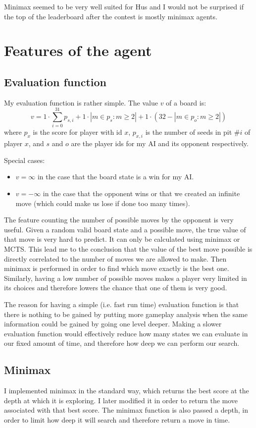 \documentclass{article}
\begin{document}
Minimax seemed to be very well suited for Hus and I would not be surprised if the top of the leaderboard after the contest is mostly minimax agents.

\section{Features of the agent}
\subsection{Evaluation function}
My evaluation function is rather simple. The value $v$ of a board is:
$$v = 1 \cdot \sum_{i=0}^{31} p_{s,i} + 1 \cdot | m \in p_s : m \geq 2 | + 1 \cdot (32-| m \in p_o : m \geq 2 |)
$$
where $p_x$ is the score for player with id $x$, $p_{x,i}$ is the number of seeds in pit \#$i$ of player $x$, and $s$ and $o$ are the player ids for my AI and its opponent respectively.

Special cases:\begin{itemize}
\item $v=\infty$ in the case that the board state is a win for my AI.
\item $v=-\infty$ in the case that the opponent wins or that we created an infinite move (which could make us lose if done too many times).
\end{itemize}

The feature counting the number of possible moves by the opponent is very useful. Given a random valid board state and a possible move, the true value of that move is very hard to predict. It can only be calculated using minimax or MCTS. This lead me to the conclusion that the value of the best move possible is directly correlated to the number of moves we are allowed to make. Then minimax is performed in order to find which move exactly is the best one. Similarly, having a low number of possible moves makes a player very limited in its choices and therefore lowers the chance that one of them is very good.

The reason for having a simple (i.e. fast run time) evaluation function is that there is nothing to be gained by putting more gameplay analysis when the same information could be gained by going one level deeper. Making a slower evaluation function would effectively reduce how many states we can evaluate in our fixed amount of time, and therefore how deep we can perform our search.

\subsection{Minimax}
I implemented minimax in the standard way, which returns the best score at the depth at which it is exploring. I later modified it in order to return the move associated with that best score. The minimax function is also passed a depth, in order to limit how deep it will search and therefore return a move in time.
\end{document}
